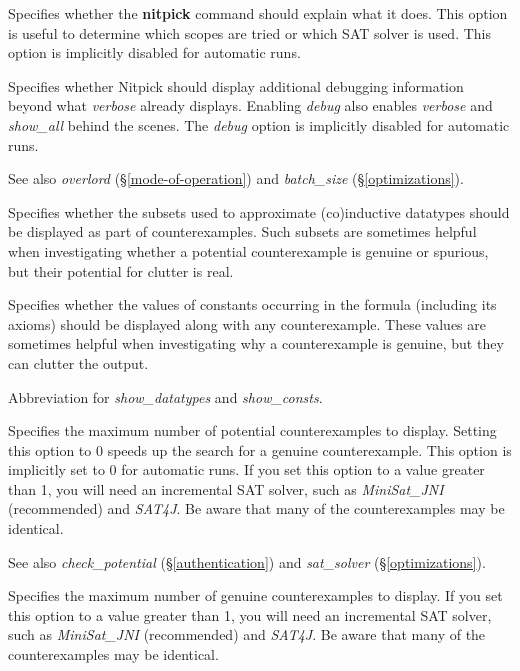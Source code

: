 \documentclass[a4paper,12pt]{article}
\begin{document}
\begin{enum}
Specifies whether the \textbf{nitpick} command should explain what it does. This
option is useful to determine which scopes are tried or which SAT solver is
used. This option is implicitly disabled for automatic runs.

Specifies whether Nitpick should display additional debugging information beyond
what \textit{verbose} already displays. Enabling \textit{debug} also enables
\textit{verbose} and \textit{show\_all} behind the scenes. The \textit{debug}
option is implicitly disabled for automatic runs.

\nopagebreak
{\small See also \textit{overlord} (\S\ref{mode-of-operation}) and
\textit{batch\_size} (\S\ref{optimizations}).}

Specifies whether the subsets used to approximate (co)in\-duc\-tive datatypes should
be displayed as part of counterexamples. Such subsets are sometimes helpful when
investigating whether a potential counterexample is genuine or spurious, but
their potential for clutter is real.

Specifies whether the values of constants occurring in the formula (including
its axioms) should be displayed along with any counterexample. These values are
sometimes helpful when investigating why a counterexample is
genuine, but they can clutter the output.

Abbreviation for \textit{show\_datatypes} and \textit{show\_consts}.

Specifies the maximum number of potential counterexamples to display. Setting
this option to 0 speeds up the search for a genuine counterexample. This option
is implicitly set to 0 for automatic runs. If you set this option to a value
greater than 1, you will need an incremental SAT solver, such as
\textit{MiniSat\_JNI} (recommended) and \textit{SAT4J}. Be aware that many of
the counterexamples may be identical.

\nopagebreak
{\small See also \textit{check\_potential} (\S\ref{authentication}) and
\textit{sat\_solver} (\S\ref{optimizations}).}

Specifies the maximum number of genuine counterexamples to display. If you set
this option to a value greater than 1, you will need an incremental SAT solver,
such as \textit{MiniSat\_JNI} (recommended) and \textit{SAT4J}. Be aware that
many of the counterexamples may be identical.


\end{enum}
\end{document}
